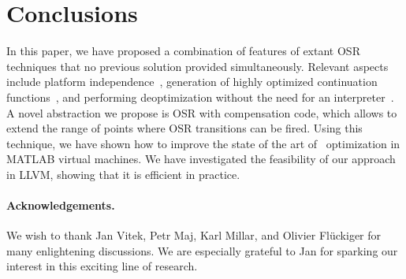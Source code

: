 
\section{Conclusions}
\label{se:conclusions}

In this paper, we have proposed a combination of features of extant OSR techniques that no previous solution provided simultaneously. Relevant aspects include platform independence~\cite{lameed2013modular}, generation of highly optimized continuation functions~\cite{fink2003design}, and performing deoptimization without the need for an interpreter~\cite{bebenita2010spur}. A novel abstraction we propose is OSR with compensation code, which allows to extend the range of points where OSR transitions can be fired. Using this technique, we have shown how to improve the state of the art of \feval\ optimization in MATLAB virtual machines. We have investigated the feasibility of our approach in LLVM, showing that it is efficient in practice.

\ifx\noauthorea\undefined
\paragraph{Acknowledgements.}

We wish to thank Jan Vitek, Petr Maj, Karl Millar, and Olivier Fl{\"u}ckiger for many enlightening discussions. We are especially grateful to Jan for sparking our interest in this exciting line of research. %
\fi
